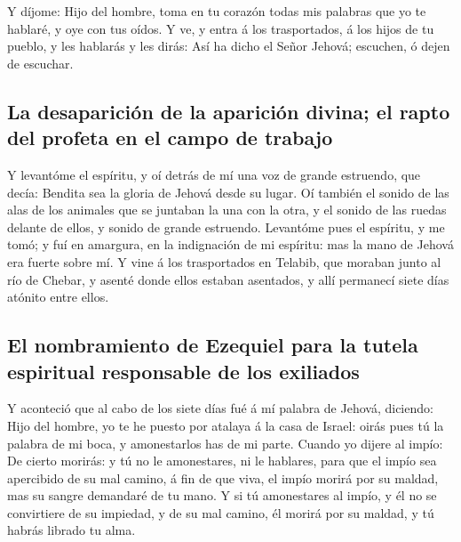  Y díjome: Hijo del hombre, toma en tu corazón todas mis
palabras que yo te hablaré, y oye con tus oídos.  Y ve, y
entra á los trasportados, á los hijos de tu pueblo, y les hablarás y les
dirás: Así ha dicho el Señor Jehová; escuchen, ó dejen de escuchar.

\hypertarget{la-desapariciuxf3n-de-la-apariciuxf3n-divina-el-rapto-del-profeta-en-el-campo-de-trabajo}{%
\subsection{La desaparición de la aparición divina; el rapto del profeta
en el campo de
trabajo}\label{la-desapariciuxf3n-de-la-apariciuxf3n-divina-el-rapto-del-profeta-en-el-campo-de-trabajo}}

 Y levantóme el espíritu, y oí detrás de mí una voz de
grande estruendo, que decía: Bendita sea la gloria de Jehová desde su
lugar.  Oí también el sonido de las alas de los animales
que se juntaban la una con la otra, y el sonido de las ruedas delante de
ellos, y sonido de grande estruendo.  Levantóme pues el
espíritu, y me tomó; y fuí en amargura, en la indignación de mi
espíritu: mas la mano de Jehová era fuerte sobre mí.  Y
vine á los trasportados en Telabib, que moraban junto al río de Chebar,
y asenté donde ellos estaban asentados, y allí permanecí siete días
atónito entre ellos.

\hypertarget{el-nombramiento-de-ezequiel-para-la-tutela-espiritual-responsable-de-los-exiliados}{%
\subsection{El nombramiento de Ezequiel para la tutela espiritual
responsable de los
exiliados}\label{el-nombramiento-de-ezequiel-para-la-tutela-espiritual-responsable-de-los-exiliados}}

 Y aconteció que al cabo de los siete días fué á mí palabra
de Jehová, diciendo:  Hijo del hombre, yo te he puesto por
atalaya á la casa de Israel: oirás pues tú la palabra de mi boca, y
amonestarlos has de mi parte.  Cuando yo dijere al impío:
De cierto morirás: y tú no le amonestares, ni le hablares, para que el
impío sea apercibido de su mal camino, á fin de que viva, el impío
morirá por su maldad, mas su sangre demandaré de tu mano. 
Y si tú amonestares al impío, y él no se convirtiere de su impiedad, y
de su mal camino, él morirá por su maldad, y tú habrás librado tu alma.

